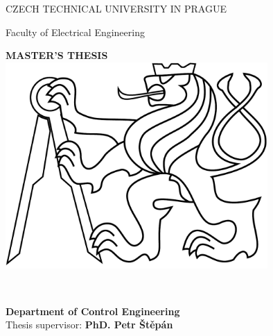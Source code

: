 \begin{titlepage}
\begin{center}

{\Large CZECH TECHNICAL UNIVERSITY IN PRAGUE}
\vskip 10pt

\vskip 8pt
{\Large Faculty of Electrical Engineering}
 
\vspace{50pt}
{\Huge\bf MASTER'S THESIS}\\
\vspace{40pt}
\includegraphics[width=10cm]{fig/lev.pdf}

\vspace{40pt}
{\Large\rm \Author } \\
\vspace{20pt}
{\Large\bf \Title}

\vspace{60pt}
{\bf Department of Control Engineering}\\
\vspace{5pt}   
{Thesis supervisor: {\bf PhD. Petr Štěpán}}

\vspace{30pt}
\end{center}
\end{titlepage}
